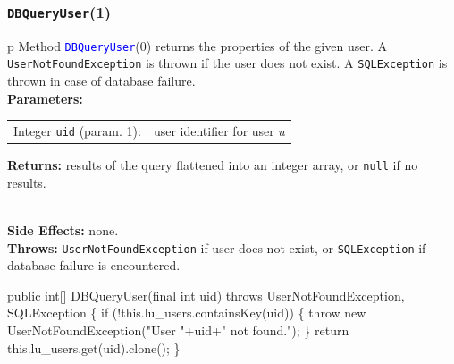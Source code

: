 \documentclass{article}
\def\nwendcode{\endtrivlist \endgroup}      %
\let\nwdocspar=\par
\theoremstyle{definition}                   %
\begin{document}
\subsubsection{{\tt{}\protect{}DBQueryUser}(1)}
\begin{tabular}{p{\textwidth}}
\toprule
{}
Method \textcolor{blue}{{\tt{}\protect{}DBQueryUser}}(0) returns the properties of the
given user.
A {\tt{}UserNotFoundException} is thrown if the user does not exist.
A {\tt{}SQLException} is thrown in case of database failure.\\
\midrule
\textbf{Parameters:} \\
\begin{tabular}{lp{116mm}}
Integer {\tt{}uid} (param. 1):&user identifier for user $u$
\end{tabular}
\textbf{Returns:} results of the query flattened into an integer array, or
{\tt{}null} if no results.

\\
\textbf{Side Effects:} none.\\
\textbf{Throws:} {\tt{}UserNotFoundException} if user does not exist, or
{\tt{}SQLException} if database failure is encountered.\\
\bottomrule
\end{tabular}
\nwenddocs{}\plusendmoddef
public int[] DBQueryUser(final int uid)
throws UserNotFoundException, SQLException \{
  if (!this.lu_users.containsKey(uid)) \{
    throw new UserNotFoundException("User "+uid+" not found.");
  \}
  return this.lu_users.get(uid).clone();
\}
\eatline
{}\nwendcode{}\nwdocspar
\end{document}
